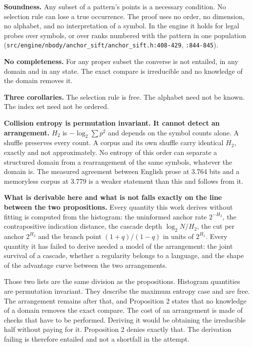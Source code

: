 \textbf{Soundness.} Any subset of a pattern's points is a necessary condition. No selection rule can lose a true occurrence. The proof uses no order, no dimension, no alphabet, and no interpretation of a symbol. In the engine it holds for legal probes over symbols, or over ranks numbered with the pattern in one population (\texttt{src/\allowbreak{}engine/\allowbreak{}nbody/\allowbreak{}anchor\_sift/\allowbreak{}anchor\_sift.h:408-429}, \texttt{:844-845}).

\textbf{No completeness.} For any proper subset the converse is not entailed, in any domain and in any state. The exact compare is irreducible and no knowledge of the domain removes it.

\textbf{Three corollaries.} The selection rule is free. The alphabet need not be known. The index set need not be ordered.

\textbf{Collision entropy is permutation invariant. It cannot detect an arrangement.} \(H_2\) is \(-\log_2 \sum p^2\) and depends on the symbol counts alone. A shuffle preserves every count. A corpus and its own shuffle carry identical \(H_2\), exactly and not approximately. No entropy of this order can separate a structured domain from a rearrangement of the same symbols, whatever the domain is. The measured agreement between English prose at 3.764 bits and a memoryless corpus at 3.779 is a weaker statement than this and follows from it.

\textbf{What is derivable here and what is not falls exactly on the line between the two propositions.} Every quantity this work derives without fitting is computed from the histogram: the uninformed anchor rate \(2^{-H_2}\), the contrapositive indication distance, the cascade depth \(\log_2 N / H_2\), the cut per anchor \(2^{H_2}\) and the branch point \((1+q)/(1-q)\) in units of \(2^{H_2}\). Every quantity it has failed to derive needed a model of the arrangement: the joint survival of a cascade, whether a regularity belongs to a language, and the shape of the advantage curve between the two arrangements.

Those two lists are the same division as the propositions. Histogram quantities are permutation invariant. They describe the maximum entropy case and are free. The arrangement remains after that, and Proposition 2 states that no knowledge of a domain removes the exact compare. The cost of an arrangement is made of checks that have to be performed. Deriving it would be obtaining the irreducible half without paying for it. Proposition 2 denies exactly that. The derivation failing is therefore entailed and not a shortfall in the attempt.


